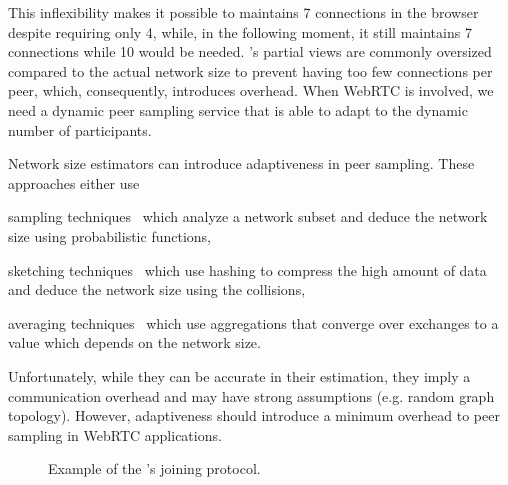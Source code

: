 
This inflexibility makes it possible to maintains 7 connections in the browser
despite requiring only 4, while, in the following moment, it still maintains 7
connections while 10 would be needed.  \CYCLON's partial views are commonly
oversized compared to the actual network size to prevent having too few
connections per peer, which, consequently, introduces overhead.  When WebRTC is
involved, we need a dynamic peer sampling service that is able to adapt to the
dynamic number of participants.

Network size estimators can introduce adaptiveness in peer sampling. These
approaches either use
\begin{inparaenum}[(i)]
\item sampling techniques~\cite{ganesh2007peer} which analyze a network subset
  and deduce the network size using probabilistic functions,
\item sketching techniques~\cite{baquero2012extrema}
  which use hashing to compress the high amount of data and deduce the network
  size using the collisions,
\item averaging techniques~\cite{jelasity2004epidemic}
  which use aggregations that converge over exchanges to a value which depends
  on the network size.
\end{inparaenum}
Unfortunately, while they can be accurate in their estimation, they imply a
communication overhead and may have strong assumptions (e.g. random graph
topology). However, adaptiveness should introduce a minimum overhead to peer
sampling in WebRTC applications.

\begin{figure*}
  \centering
  \hspace{8pt}
  \hspace{8pt}
  \caption{\label{fig:joiningexample}Example of the \SPRAY's joining
    protocol.}
\end{figure*}

